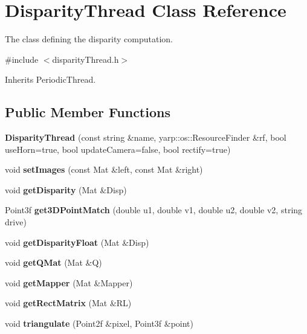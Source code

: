 \section{Disparity\+Thread Class Reference}
\label{classDisparityThread}


The class defining the disparity computation.  




{\ttfamily \#include $<$disparity\+Thread.\+h$>$}



Inherits Periodic\+Thread.

\subsection*{Public Member Functions}
\begin{DoxyCompactItemize}
\item 
\mbox{\label{classDisparityThread_ab53d3046d1397fb7c0eef512e1aae683}} 
{\bfseries Disparity\+Thread} (const string \&name, yarp\+::os\+::\+Resource\+Finder \&rf, bool use\+Horn=true, bool update\+Camera=false, bool rectify=true)
\item 
\mbox{\label{classDisparityThread_a8d0ab9537256c9387ba1bf2b48ebfbca}} 
void {\bfseries set\+Images} (const Mat \&left, const Mat \&right)
\item 
\mbox{\label{classDisparityThread_a9d7c5ff0ddc84fbc74f78e6bc77c8297}} 
void {\bfseries get\+Disparity} (Mat \&Disp)
\item 
\mbox{\label{classDisparityThread_ae499c13ea55662aa612781d0d7488741}} 
Point3f {\bfseries get3\+D\+Point\+Match} (double u1, double v1, double u2, double v2, string drive)
\item 
\mbox{\label{classDisparityThread_aadcaf0193ce0c9418392803c77725efc}} 
void {\bfseries get\+Disparity\+Float} (Mat \&Disp)
\item 
\mbox{\label{classDisparityThread_a0c5d331cc596e81ba9bfb67770a67fa7}} 
void {\bfseries get\+Q\+Mat} (Mat \&Q)
\item 
\mbox{\label{classDisparityThread_af7d1aee791ada6fdf79be8bf8e40e260}} 
void {\bfseries get\+Mapper} (Mat \&Mapper)
\item 
\mbox{\label{classDisparityThread_a0c0b139ecaf7fa43a63ce6610c184288}} 
void {\bfseries get\+Rect\+Matrix} (Mat \&RL)
\item 
\mbox{\label{classDisparityThread_a9f132e68856b56d0dded0f1435d1f34c}} 
void {\bfseries triangulate} (Point2f \&pixel, Point3f \&point)
\item 

\end{DoxyCompactItemize}
